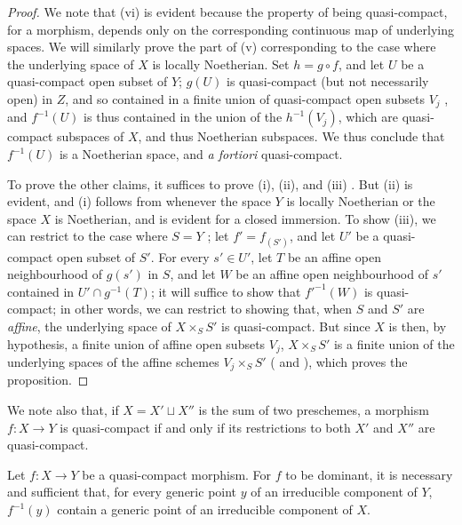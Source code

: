 \begin{proof}
We note that (vi) is evident because the property of being quasi-compact, for a morphism, depends only on the corresponding continuous map of underlying spaces.
We will similarly prove the part of (v) corresponding to the case where the underlying space of $X$ is locally Noetherian.
Set $h=g\circ f$, and let $U$ be a quasi-compact open subset of $Y$;
$g(U)$ is quasi-compact (but not necessarily open) in $Z$, and so contained in a finite union of quasi-compact open subsets $V_j$ , and $f^{-1}(U)$ is thus contained in the union of the $h^{-1}(V_j)$, which are quasi-compact subspaces of $X$, and thus Noetherian subspaces.
We thus conclude  that $f^{-1}(U)$ is a Noetherian space, and \emph{a fortiori} quasi-compact.

To prove the other claims, it suffices to prove (i), (ii), and (iii) .
But (ii) is evident, and (i) follows from  whenever the space $Y$ is locally Noetherian or the space $X$ is Noetherian, and is evident for a closed immersion.
To show (iii), we can restrict to the case where $S=Y$ ;
let $f'=f_{(S')}$, and let $U'$ be a quasi-compact open subset of $S'$.
For every $s'\in U'$, let $T$ be an affine open neighbourhood of $g(s')$ in $S$, and let $W$ be an affine open neighbourhood of $s'$ contained in $U'\cap g^{-1}(T)$;
it will suffice to show that $f'^{-1}(W)$ is quasi-compact;
in other words, we can restrict to showing that, when $S$ and $S'$ are \emph{affine}, the underlying space of $X\times_S S'$ is quasi-compact.
But since $X$ is then, by hypothesis, a finite union of affine open subsets $V_j$, $X\times_S S'$ is a finite union of the underlying spaces of the affine schemes $V_j\times_S S'$ ( and ), which proves the proposition.
\end{proof}

We note also that, if $X=X'\sqcup X''$ is the sum of two preschemes, a morphism $f:X\to Y$ is quasi-compact if and only if its restrictions to both $X'$ and $X''$ are quasi-compact.

\begin{proposition}[6.6.5]
\label{I.6.6.5}
Let $f:X\to Y$ be a quasi-compact morphism.
For $f$ to be dominant, it is necessary and sufficient that, for every generic point $y$ of an irreducible component of $Y$, $f^{-1}(y)$ contain a generic point of an irreducible component of $X$.
\end{proposition}


